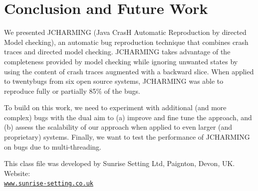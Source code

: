 \documentclass[times]{smrauth}
\begin{document}
\section{Conclusion and Future Work\label{sec:conclusion}}

We presented JCHARMING (Java CrasH Automatic
Reproduction by directed Model checking), an automatic bug
reproduction technique that combines crash traces and
directed model checking. JCHARMING takes advantage of
the completeness provided by model checking while ignoring
unwanted states by using the content of crash traces
augmented with a backward slice. When applied to twentybugs from six open source systems, JCHARMING was able to
reproduce fully or partially 85\% of the bugs.

To build on this work, we need to experiment with additional
(and more complex) bugs with the dual aim to (a) improve and
fine tune the approach, and (b) assess the scalability of our
approach when applied to even larger (and proprietary)
systems. Finally, we want to test the performance of
JCHARMING on bugs due to multi-threading.

\ack This class file was developed by Sunrise Setting Ltd,
Paignton, Devon, UK. Website:\\
\href{http://www.sunrise-setting.co.uk}{\texttt{www.sunrise-setting.co.uk}}



\end{document}
